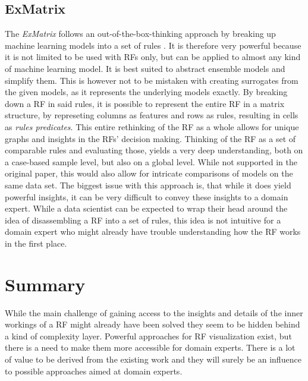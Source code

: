 \documentclass[a4paper, 12pt]{article}
\begin{document}
\subsection{ExMatrix}
The \textit{ExMatrix} follows an out-of-the-box-thinking approach by breaking up machine
learning models into a set of rules \cite{neto2020explainable} \cite{ming2018rulematrix}. It is therefore very powerful because it is not limited
to be used with RFs only, but can be applied to almost any kind of machine learning model.
It is best suited to abstract ensemble models and simplify them. This is however not to be
mistaken with creating surrogates from the given models, as it represents the underlying
models exactly. By breaking down a RF in said rules, it is possible to represent the entire
RF in a matrix structure, by represeting columns as features and rows as rules, resulting in
cells as \textit{rules predicates}. This entire rethinking of the RF as a whole allows for
unique graphs and insights in the RFs' decision making. Thinking of the RF as a set of
comparable rules and evaluating those, yields a very deep understanding, both on a
case-based sample level, but also on a global level. While not supported in the original
paper, this would also allow for intricate comparisons of models on the same data set.
The biggest issue with this approach is, that while it does yield powerful insights, it can
be very difficult to convey these insights to a domain expert. While a data scientist can be
expected to wrap their head around the idea of disassembling a RF into a set of rules, this
idea is not intuitive for a domain expert who might already have trouble understanding how
the RF works in the first place.


\section{Summary}
While the main challenge of gaining access to the insights and details of the inner workings
of a RF might already have been solved they seem to be hidden behind a kind of complexity
layer. Powerful approaches for RF visualization exist, but there is a need to make them more
accessible for domain experts. There is a lot of value to be derived from the existing work
and they will surely be an influence to possible approaches aimed at domain experts.

\clearpage


\end{document}
